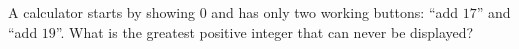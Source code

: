 A calculator starts by showing $0$ and has only two working buttons: ``add $17$'' and ``add $19$''. What is the greatest positive integer that can never be displayed?
